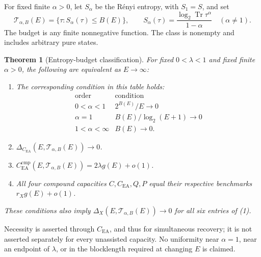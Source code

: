 \documentclass[11pt]{article}
\newtheorem{theorem}{Theorem}
\newcommand{\Tr}{\operatorname{Tr}}
\newcommand{\CEA}{C_{\mathrm{EA}}}
\newcommand{\Tcal}{\mathcal T}
\newcommand{\comp}{\mathrm{cmp}}
\begin{document}
For fixed finite \(\alpha>0\), let \(S_\alpha\) be the R\'enyi entropy,
with \(S_1=S\), and set
\[
 \Tcal_{\alpha,B}(E)=\{\tau:S_\alpha(\tau)\le B(E)\},\qquad
 S_\alpha(\tau)=\frac{\log_2\Tr\tau^\alpha}{1-\alpha}
 \quad(\alpha\ne1).                                           \tag{3}
\]
The budget is any finite nonnegative function. The class is nonempty
and includes arbitrary pure states.

\begin{theorem}[Entropy-budget classification]\label{thm:main}
For fixed \(0<\lambda<1\) and fixed finite \(\alpha>0\), the following
are equivalent as \(E\to\infty\):
\begin{enumerate}
\item The corresponding condition in this table holds:
\[
\begin{array}{c|c}
 \text{order}&\text{condition}\\ \hline
 0<\alpha<1&2^{B(E)}/E\longrightarrow0\\
 \alpha=1&B(E)/\log_2(E+1)\longrightarrow0\\
 1<\alpha<\infty&B(E)\longrightarrow0 .
\end{array}                                                    \tag{4}
\]
\item \(\Delta_{\CEA}(E,\Tcal_{\alpha,B}(E))\to0\).
\item \(\CEA^{\comp}(E,\Tcal_{\alpha,B}(E))=2\lambda g(E)+o(1)\).
\item All four compound capacities \(C,\CEA,Q,P\) equal their respective
benchmarks \(r_Xg(E)+o(1)\).
\end{enumerate}
These conditions also imply \(\Delta_X(E,\Tcal_{\alpha,B}(E))\to0\)
for all six entries of (1).
\end{theorem}

Necessity is asserted through \(\CEA\), and thus for simultaneous
recovery; it is not asserted separately for every unassisted capacity.
No uniformity near \(\alpha=1\), near an endpoint of \(\lambda\), or in
the blocklength required at changing \(E\) is claimed.
\end{document}
